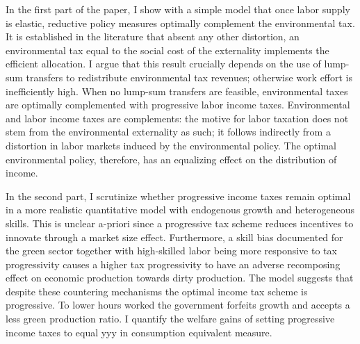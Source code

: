 In the first part of the paper, I show with a simple model that once 
labor supply is elastic, reductive policy measures optimally complement the environmental tax.
It is established in the literature that absent any other distortion, an environmental tax equal to the social cost of the externality implements the efficient allocation. I argue that this result crucially depends on the use of lump-sum transfers to redistribute environmental tax revenues; otherwise work effort is inefficiently high.
 When no lump-sum transfers are feasible,  environmental taxes are optimally complemented with progressive labor income taxes. Environmental and labor income taxes are complements: the motive for labor taxation does not stem from the environmental externality as such; it follows indirectly from a distortion in labor markets induced by the environmental policy. %
The optimal environmental policy, therefore, has an equalizing effect on the distribution of income.

In the second part, I scrutinize whether progressive income taxes remain optimal in a more realistic quantitative model with endogenous growth and heterogeneous skills. 
This is unclear a-priori since a progressive tax scheme reduces incentives to innovate through a market size effect. Furthermore, a skill bias documented for the green sector \citep{Consoli2016DoCapital} together with high-skilled labor being more responsive to tax progressivity causes a higher tax progressivity to have an adverse recomposing effect on economic production towards dirty production. The model suggests that despite these countering mechanisms the optimal income tax scheme is progressive. To lower hours worked the government forfeits growth and accepts a less green production ratio. I quantify the welfare gains of setting progressive income taxes to equal yyy in consumption equivalent measure.  

